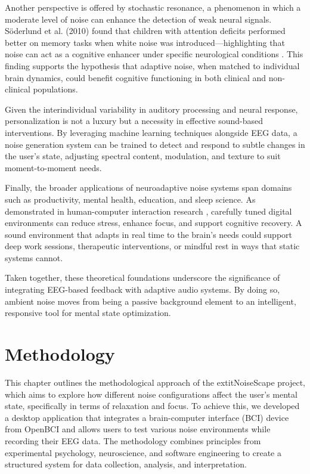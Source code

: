 Another perspective is offered by stochastic resonance, a phenomenon in which a moderate level of noise can enhance the detection of weak neural signals. Söderlund et al. (2010) found that children with attention deficits performed better on memory tasks when white noise was introduced—highlighting that noise can act as a cognitive enhancer under specific neurological conditions \cite{soderlund2010}. This finding supports the hypothesis that adaptive noise, when matched to individual brain dynamics, could benefit cognitive functioning in both clinical and non-clinical populations.

Given the interindividual variability in auditory processing and neural response, personalization is not a luxury but a necessity in effective sound-based interventions. By leveraging machine learning techniques alongside EEG data, a noise generation system can be trained to detect and respond to subtle changes in the user’s state, adjusting spectral content, modulation, and texture to suit moment-to-moment needs.

Finally, the broader applications of neuroadaptive noise systems span domains such as productivity, mental health, education, and sleep science. As demonstrated in human-computer interaction research \cite{mark2016}, carefully tuned digital environments can reduce stress, enhance focus, and support cognitive recovery. A sound environment that adapts in real time to the brain’s needs could support deep work sessions, therapeutic interventions, or mindful rest in ways that static systems cannot.

Taken together, these theoretical foundations underscore the significance of integrating EEG-based feedback with adaptive audio systems. By doing so, ambient noise moves from being a passive background element to an intelligent, responsive tool for mental state optimization.




\section{Methodology}

This chapter outlines the methodological approach of the 	extit{NoiseScape} project, which aims to explore how different noise configurations affect the user’s mental state, specifically in terms of relaxation and focus. To achieve this, we developed a desktop application that integrates a brain-computer interface (BCI) device from OpenBCI and allows users to test various noise environments while recording their EEG data. The methodology combines principles from experimental psychology, neuroscience, and software engineering to create a structured system for data collection, analysis, and interpretation.

